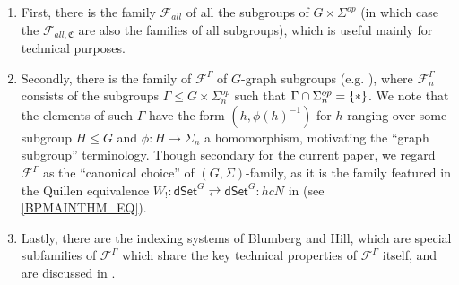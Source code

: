 \documentclass[a4paper,10pt
,draft
]{article}%
\numberwithin{equation}{section}
\numberwithin{figure}{section}
\theoremstyle{definition} %
\newcommand{\F}{\ensuremath{\mathcal F}}
\newcommand{\1}{\ensuremath{\mathbbm 1}}%
\begin{document}
\begin{enumerate}[label = (\alph*)]
\item First, there is the family $\F_{all}$ of all the subgroups of $G \times \Sigma^{op}$
      (in which case the $\F_{all,\mathfrak{C}}$ are also the families of all subgroups), which is useful mainly for technical purposes.
      
\item Secondly, there is the family of $\F^{\Gamma}$
      of $G$-graph subgroups (e.g. \cite[Def. 6.36]{BP_geo}),
      where $\F^{\Gamma}_n$ consists of the subgroups
      $\Gamma \leq G \times \Sigma_n^{op}$
      such that $\Gamma \cap \Sigma_n^{op} = \{\**\}$.
      We note that the elements of such $\Gamma$
      have the form $(h,\phi(h)^{-1})$
      for $h$ ranging over some subgroup $H \leq G$
      and $\phi \colon H \to \Sigma_n$
      a homomorphism,
      motivating the ``graph subgroup'' terminology.
%
      Though secondary for the current paper, 
      we regard $\F^{\Gamma}$ as the ``canonical choice'' of
      $(G,\Sigma)$-family, 
      as it is the family featured in the Quillen equivalence
      $W_! \colon 
      \mathsf{dSet}^G \rightleftarrows 
      \mathsf{dSet}^G \colon hcN$
      in \cite[Thm. I]{BP_TAS} 
      (see \eqref{BPMAINTHM_EQ}).
      
\item Lastly, there are the indexing systems of Blumberg and Hill,
      which are special subfamilies of $\F^{\Gamma}$
      which share the key technical properties of 
      $\F^{\Gamma}$ itself,
      and are discussed in 
      \cite[\S \ref{OC-INDSYS_SEC}]{BP_FCOP}.
\end{enumerate}
\end{document}
